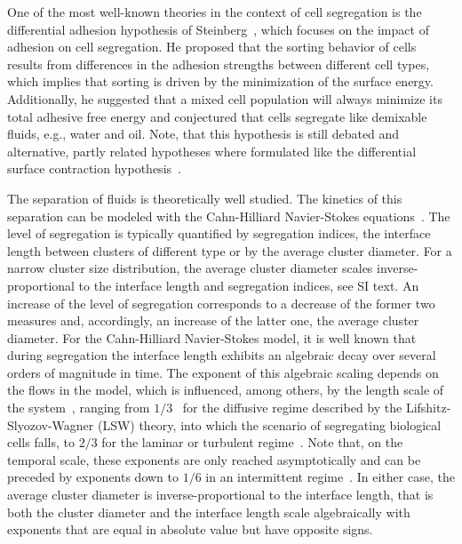 \documentclass[10pt,letterpaper]{article}
\begin{document}
One of the most well-known theories in the context of cell segregation
is the differential adhesion
hypothesis of Steinberg~\cite{Ste1970, Ste1963}, which focuses on the
impact of adhesion on cell segregation. He proposed that the sorting
behavior of cells results from differences in the adhesion strengths
between different cell types, which implies that sorting is driven by
the minimization of the surface energy. Additionally, he suggested that a mixed
cell population will always minimize its total adhesive free energy
and conjectured that cells segregate like demixable fluids, e.g.,
water and oil. Note, that this hypothesis is still debated and
alternative, partly related hypotheses where formulated like the
differential surface contraction hypothesis~\cite{Har1976}.

The separation of fluids is theoretically well studied. The kinetics
of this separation can be modeled with the Cahn-Hilliard Navier-Stokes
equations~\cite{LamMau2008, Voo1985, VooGli1988}. The level of
segregation is typically quantified by segregation indices,
the interface length between clusters of different type or by the average
cluster diameter. For a narrow cluster size distribution, the average cluster
diameter scales inverse-proportional to the interface length and segregation
indices, see SI text. An increase of the level of segregation corresponds
to a decrease of the former two measures and, accordingly, an increase
of the latter one, the average cluster diameter. For the Cahn-Hilliard
Navier-Stokes model, it is well known that during segregation the
interface length exhibits an algebraic decay over several orders of
magnitude in time. The exponent of this algebraic scaling depends on
the flows in the model, which is influenced, among others, by the
length scale of the system~\cite{NasNar2017}, ranging from
$1/3$~\cite{WitBacVoi2012, NasNar2017, GarNieRum2003} for the diffusive
regime described by the Lifshitz-Slyozov-Wagner (LSW) theory, into which
the scenario of segregating biological cells falls,
to $2/3$ for the laminar or turbulent regime~\cite{NasNar2017}. Note
that, on the temporal scale, these exponents are only reached
asymptotically and can be
preceded by exponents down to $1/6$ in an intermittent
regime~\cite{GarNieRum2003}. In either case, the average cluster
diameter is inverse-proportional to the interface length, that is both
the cluster diameter and the interface length scale algebraically with
exponents that are equal in absolute value but have opposite signs.
\end{document}
